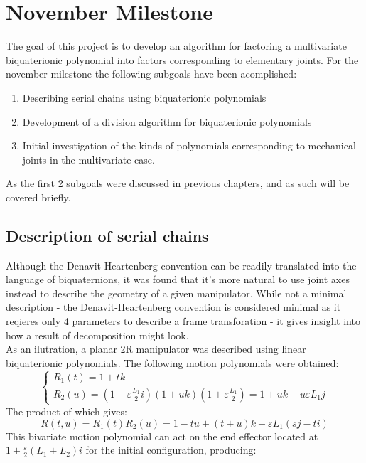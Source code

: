 \chapter{November Milestone}
The goal of this project is to develop an algorithm for factoring a multivariate biquaterionic polynomial into factors corresponding to elementary
joints. For the november milestone the following subgoals have been acomplished:
\begin{enumerate}
        \item Describing serial chains using biquaterionic polynomials
        \item Development of a division algorithm for biquaterionic polynomials
        \item Initial investigation of the kinds of polynomials corresponding to mechanical joints in the multivariate case.
        
\end{enumerate}
As the first 2 subgoals were discussed in previous chapters, and as such will be covered briefly.
\section{Description of serial chains}
Although the Denavit-Heartenberg convention can be readily translated into
the language of biquaternions, it was found that it's more natural to use joint axes instead to describe the geometry of a given manipulator. 
While not a minimal description - the Denavit-Heartenberg convention is considered minimal as it reqieres only 4 parameters to describe a frame transforation - it gives insight into how a result of decomposition might look.
\\
As an ilutration, a planar 2R manipulator was described using linear
biquaterionic polynomials. The following motion polynomials
were obtained:
        \begin{equation}
            \begin{cases}
                R_1(t) = 1 + tk\\
                R_2(u) = (1-\varepsilon\frac{L_1}{2}i)(1+uk)(1+\varepsilon\frac{L_1}{2}) = 1+uk + u\varepsilon L_1j
            \end{cases}
        \end{equation}
        The product of which gives:
        \begin{equation}
           R(t,u)= R_1(t)R_2(u) = 1-tu +(t+u)k + \varepsilon L_1(sj-ti)
        \end{equation}
This bivariate motion polynomial can act on the end effector located at $1+\frac{\varepsilon}{2}(L_1+L_2)i$ for the initial configuration, producing:

